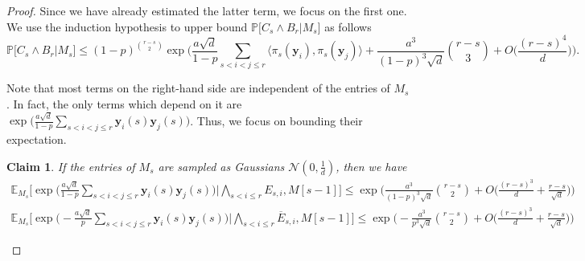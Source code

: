 \documentclass[11pt]{amsart}
\newtheorem{claim}[theorem]{\bf Claim}
\theoremstyle{definition}
\def\cN{\mathcal{N}}
\def\bE{\mathbb{E}}
\def\Pb{\mathbb{P}}
\def\by{\boldsymbol{y}}
\begin{document}
\begin{proof}
Since we have already estimated the latter term, we focus on the first one. We use the induction hypothesis to upper bound $\Pb\Big[C_{s}\wedge B_r\Big| M_{s}\Big]$ as follows
{\smaller[0.3]
\begin{equation}\label{eq:induction_hypothesis_blue}
    \Pb\Big[C_{s}\wedge B_r\Big| M_{s}\Big]\leq (1\!-\!p)^{\binom{r-s}{2}}\exp\bigg(\frac{a\sqrt{d}}{1\!-\!p}\!\!\sum_{s<i< j\leq r}\!\!\!\!\langle \pi_s(\by_i), \pi_s(\by_j)\rangle + \frac{a^3}{(1\!-\!p)^3\sqrt{d}}\binom{r\!-\!s}{3}\!+\!O\Big(\frac{(r\!-\!s)^4}{d}\Big)\bigg).
\end{equation}
}

Note that most terms on the right-hand side are independent of the entries of $M_s$. In fact, the only terms which depend on it are $\exp\Big(\frac{a\sqrt{d}}{1-p}\sum_{s<i<j\leq r} \by_i(s)\by_j(s)\Big)$. Thus, we focus on bounding their expectation.

\begin{claim}\label{claim:auxiliary_2}
If the entries of $M_s$ are sampled as Gaussians $\cN(0, \frac{1}{d})$, then we have
{\smaller[0.3]
\begin{align}
    \bE_{M_s}\bigg[\exp\bigg(\frac{a\sqrt{d}}{1\!-\!p}\!\!\sum_{s<i<j\leq r}\!\! \by_i(s)\by_j(s)\bigg)\bigg| \bigwedge_{s<i\leq r}\!\! E_{s, i}, M[s\!-\!1]\bigg]\leq  \exp\bigg(\frac{a^3}{(1\!-\!p)^3\sqrt{d}}\binom{r\!-\!s}{2}\!+\!O\Big(\frac{(r\!-\!s)^3}{d}\!+\!\frac{r-s}{\sqrt{d}}\Big)\bigg)\label{eq:auxiliary_2_blue}    \\
    \bE_{M_s}\bigg[\exp\bigg(\!-\!\frac{a\sqrt{d}}{p}\!\!\sum_{s<i<j\leq r}\!\! \by_i(s)\by_j(s)\bigg)\bigg| \bigwedge_{s<i\leq r}\!\! \overline{E}_{s, i}, M[s\!-\!1]\bigg]\leq \exp\bigg(\!-\!\frac{a^3}{p^3\sqrt{d}}\binom{r\!-\!s}{2}\!+\!O\Big(\frac{(r\!-\!s)^3}{d}\!+\!\frac{r-s}{\sqrt{d}}\Big)\bigg)\label{eq:auxiliary_2_red}
\end{align}
}
\end{claim}


\end{proof}
\end{document}
